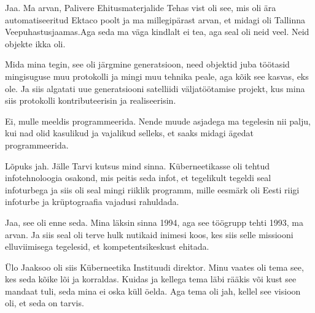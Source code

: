 
Jaa. Ma arvan, Palivere Ehitusmaterjalide Tehas vist oli see, mis oli ära automatiseeritud Ektaco 
poolt ja ma millegipärast arvan, et midagi oli Tallinna 
Veepuhastusjaamas.Aga seda ma väga kindlalt ei 
tea, aga seal oli neid veel. Neid objekte ikka oli.

Mida mina tegin, see oli järgmine generatsioon, need objektid juba töötasid 
mingisuguse muu protokolli ja mingi muu  tehnika peale, aga kõik see kasvas, 
eks ole. Ja siis algatati uue generatsiooni satelliidi väljatöötamise projekt, 
kus mina siis  protokolli kontributeerisin ja realiseerisin. 


Ei, mulle meeldis programmeerida. Nende muude asjadega ma tegelesin nii palju, 
kui nad olid kasulikud ja vajalikud selleks, et saaks midagi ägedat 
programmeerida. 



Lõpuks jah. Jälle Tarvi kutsus mind sinna. 
Küberneetikasse oli tehtud infotehnoloogia osakond, mis peitis seda infot, et 
tegelikult tegeldi seal infoturbega ja siis oli seal mingi riiklik programm, 
mille eesmärk oli Eesti riigi infoturbe ja krüptograafia vajadusi rahuldada. 


Jaa, see oli enne seda. Mina läksin sinna 1994, aga see töögrupp tehti 1993, ma 
arvan. Ja siis seal oli terve hulk nutikaid inimesi koos, kes siis  selle 
missiooni elluviimisega tegelesid, et  kompetentsikeskust ehitada.

Ülo Jaaksoo oli siis Küberneetika 
Instituudi direktor. Minu vaates oli tema see, 
kes seda kõike lõi ja korraldas. Kuidas ja  kellega tema läbi rääkis või kust 
see mandaat tuli, seda mina ei oska küll öelda. Aga tema oli jah, kellel see 
visioon  oli, et seda on tarvis. 


